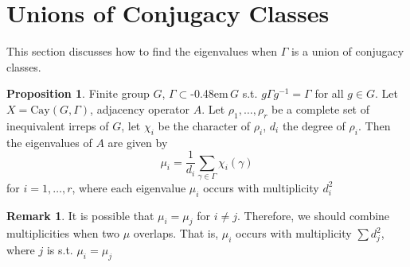 \documentclass{book}
\newcommand{\syin}{$\subset$\kern-0.48em\raisebox{.20ex}{\tiny S}$\,$}
\newcommand{\Cay}[1]{\textrm{Cay}( #1 )}
\theoremstyle{definition}
\newtheorem{proposition}[lemma]{Proposition}
\theoremstyle{remarkstyle}
\newtheorem*{remark}{Remark}%
\begin{document}
\section{Unions of Conjugacy Classes}
This section discusses how to find the eigenvalues when $\Gamma$ is a union of conjugacy classes. \newline 

\begin{proposition}
    Finite group $G$, $\Gamma$\syin$G$ s.t. $g\Gamma g^{-1} = \Gamma $ for all $g\in G$. Let $X=\Cay{G,\Gamma}$, adjacency operator $A$. Let $\rho_1,\dots,\rho_r$ be a complete set of inequivalent irreps of $G$, let $\chi_i$ be the character of $\rho_i$, $d_i$ the degree of $\rho_i$. Then the eigenvalues of $A$ are given by 
    $$
    \mu_i = \frac{1}{d_i}\sum_{\gamma\in\Gamma}\chi_i(\gamma)
    $$
    for $i=1,\dots,r$, where each eigenvalue $\mu_i$ occurs with multiplicity $d^2_i$
\end{proposition}
\begin{remark}
    It is possible that $\mu_i=\mu_j$ for $i\neq j$. Therefore, we should combine multiplicities when two $\mu$ overlaps. That is, $\mu_i$ occurs with multiplicity $\sum d^2_j$, where $j$ is s.t. $\mu_i=\mu_j$
\end{remark}
\end{document}
